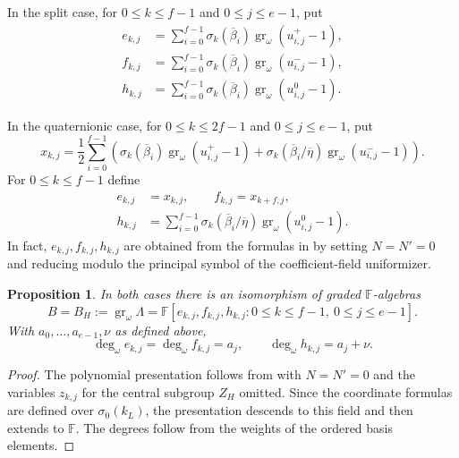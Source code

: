 \documentclass[11pt]{article}
\numberwithin{equation}{section}
\newtheorem{proposition}[theorem]{Proposition}
\theoremstyle{definition}
\theoremstyle{remark}
\newcommand{\F}{\mathbb F}
\DeclareMathOperator{\gr}{gr}
\begin{document}
In the split case, for $0\leq k\leq f-1$ and $0\leq j\leq e-1$, put
\begin{equation}\label{eq:split-graded-coordinates}
 \begin{aligned}
 e_{k,j}&=\sum_{i=0}^{f-1}\sigma_k(\overline\beta_i)
                            \gr_\omega(u^+_{i,j}-1),\\
 f_{k,j}&=\sum_{i=0}^{f-1}\sigma_k(\overline\beta_i)
                            \gr_\omega(u^-_{i,j}-1),\\
 h_{k,j}&=\sum_{i=0}^{f-1}\sigma_k(\overline\beta_i)
                            \gr_\omega(u^0_{i,j}-1).
 \end{aligned}
\end{equation}

In the quaternionic case, for $0\leq k\leq 2f-1$ and $0\leq j\leq e-1$, put
\[
 x_{k,j}=\frac12\sum_{i=0}^{f-1}\left(
    \sigma_k(\overline\beta_i)\gr_\omega(u^+_{i,j}-1)
   +\sigma_k(\overline\beta_i/\overline\eta)
                           \gr_\omega(u^-_{i,j}-1)\right).
\]
For $0\leq k\leq f-1$ define
\begin{equation}\label{eq:quaternionic-graded-coordinates}
 \begin{aligned}
 e_{k,j}&=x_{k,j},\qquad f_{k,j}=x_{k+f,j},\\
 h_{k,j}&=\sum_{i=0}^{f-1}
             \sigma_k(\overline\beta_i/\overline\eta)
                           \gr_\omega(u^0_{i,j}-1).
 \end{aligned}
\end{equation}
In fact, $e_{k,j},f_{k,j},h_{k,j}$ are obtained from the formulas in
\cite[Lemma~6.3]{Sor26b} by setting $N=N'=0$ and reducing modulo
the principal symbol of the coefficient-field uniformizer.

\begin{proposition}\label{prop:graded-algebra}
In both cases there is an isomorphism of graded $\F$-algebras
\begin{equation}\label{eq:graded-presentation}
 B=B_H:=\gr_\omega\Lambda
   =\F[e_{k,j},f_{k,j},h_{k,j}:0\leq k\leq f-1,\ 0\leq j\leq e-1].
\end{equation}
With $a_0,\ldots,a_{e-1},\nu$ as defined above,
\[
 \deg_\omega e_{k,j}=\deg_\omega f_{k,j}=a_j,\qquad
 \deg_\omega h_{k,j}=a_j+\nu.
\]
\end{proposition}

\begin{proof}
The polynomial presentation follows from \cite[Lemma~6.3]{Sor26b}
with $N=N'=0$ and the variables $z_{k,j}$ for the central subgroup
$Z_H$ omitted.
Since the coordinate formulas are defined over $\sigma_0(k_L)$,
the presentation descends to this field and then extends to $\F$.
The degrees follow from the weights of the ordered basis elements.
\end{proof}
\end{document}
